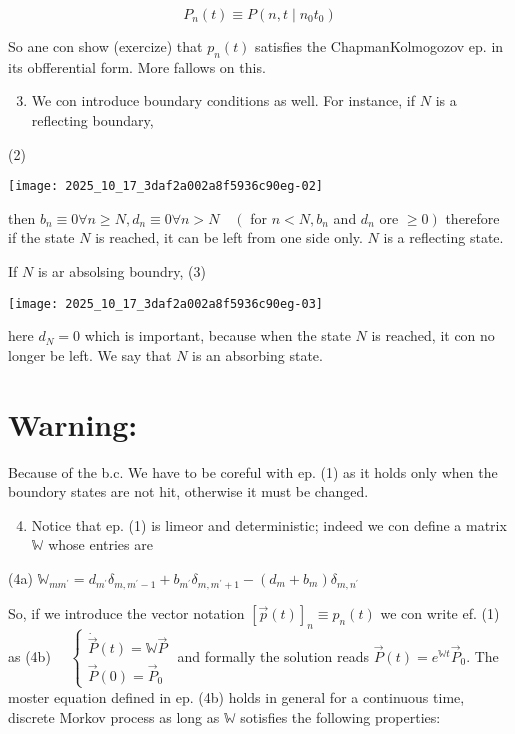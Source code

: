 $$
 P_{n}(t) \equiv P\left(n, t \mid n_{0} t_{0}\right)
$$ 

So ane con show (exercize) that $p_{n}(t)$ satisfies the ChapmanKolmogozov ep. in its obfferential form. More fallows on this.
\begin{enumerate}
\setcounter{enumi}{2}
  \item We con introduce boundary conditions as well. For instance, if $N$ is a reflecting boundary,
\end{enumerate}
(2)
\begin{center}
\texttt{[image: 2025\_10\_17\_3daf2a002a8f5936c90eg-02]}
\end{center}
then $b_{n} \equiv 0 \forall n \geqslant N, d_{n} \equiv 0 \forall n>N \quad\left(\right.$ for $n<N, b_{n}$ and $d_{n}$ ore $\left.\geqslant 0\right)$ therefore if the state $N$ is reached, it can be left from one side only. $N$ is a reflecting state.

If $N$ is ar absolsing boundry,
(3)
\begin{center}
\texttt{[image: 2025\_10\_17\_3daf2a002a8f5936c90eg-03]}
\end{center}
here $d_{N}=0$ which is important, because when the state $N$ is reached, it con no longer be left. We say that $N$ is an absorbing state.

\section*{Warning:}
Because of the b.c. We have to be coreful with ep. (1) as it holds only when the boundory states are not hit, otherwise it must be changed.
\begin{enumerate}
\setcounter{enumi}{3}
  \item Notice that ep. (1) is limeor and deterministic; indeed we con define a matrix $\mathbb{W}$ whose entries are
\end{enumerate}
(4a) $\mathbb{W}_{m m^{\prime}}=d_{m^{\prime}} \delta_{m, m^{\prime}-1}+b_{m^{\prime}} \delta_{m, m^{\prime}+1}-\left(d_{m}+b_{m}\right) \delta_{m, n^{\prime}}$

So, if we introduce the vector notation $[\vec{p}(t)]_{n} \equiv p_{n}(t)$ we con write ef. (1) as
(4b) $\quad\left\{\begin{array}{l}\dot{\vec{P}}(t)=\mathbb{W} \vec{P} \\ \vec{P}(0)=\vec{P}_{0}\end{array}\right.$
and formally the solution reads $\vec{P}(t)=e^{\mathbb{W} t} \vec{P}_{0}$.
The moster equation defined in ep. (4b) holds in general for a continuous time, discrete Morkov process as long as $\mathbb{W}$ sotisfies the following properties:

